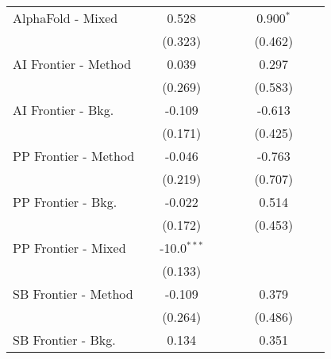 \begin{tabular}{lcccccccc}
   AlphaFold - Mixed                              &               & 0.528         &        &        &         & 0.900$^{*}$ &       &   \\   
                                                  &               & (0.323)       &        &        &         & (0.462)     &       &   \\   
   AI Frontier - Method                           &               & 0.039         &        &        &         & 0.297       &       &   \\   
                                                  &               & (0.269)       &        &        &         & (0.583)     &       &   \\   
   AI Frontier - Bkg.                             &               & -0.109        &        &        &         & -0.613      &       &   \\   
                                                  &               & (0.171)       &        &        &         & (0.425)     &       &   \\   
   PP Frontier - Method                           &               & -0.046        &        &        &         & -0.763      &       &   \\   
                                                  &               & (0.219)       &        &        &         & (0.707)     &       &   \\   
   PP Frontier - Bkg.                             &               & -0.022        &        &        &         & 0.514       &       &   \\   
                                                  &               & (0.172)       &        &        &         & (0.453)     &       &   \\   
   PP Frontier - Mixed                            &               & -10.0$^{***}$ &        &        &         &             &       &   \\   
                                                  &               & (0.133)       &        &        &         &             &       &   \\   
   SB Frontier - Method                           &               & -0.109        &        &        &         & 0.379       &       &   \\   
                                                  &               & (0.264)       &        &        &         & (0.486)     &       &   \\   
   SB Frontier - Bkg.                             &               & 0.134         &        &        &         & 0.351       &       &   \\   

\end{tabular}
